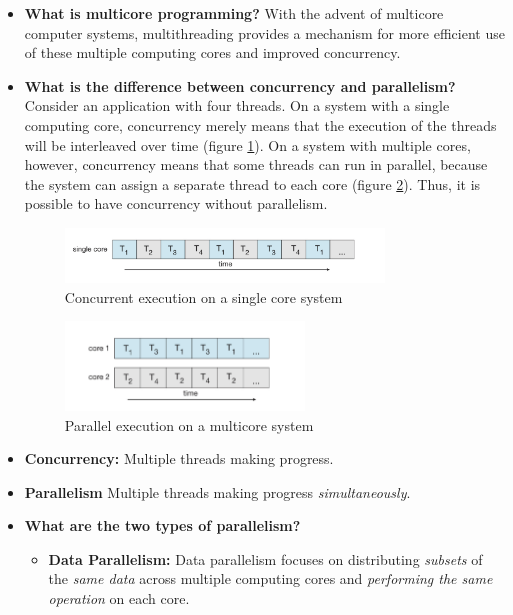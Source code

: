 \documentclass[12pt]{article}
\begin{document}
\begin{itemize}
    \item \textbf{What is multicore programming?} With the advent of multicore computer systems, multithreading provides a mechanism for more efficient use of these multiple computing cores and improved concurrency.
    \item \textbf{What is the difference between concurrency and parallelism?} Consider an application with four threads. On a system with a single computing core, concurrency merely means that the execution of the threads will be interleaved over time (figure \ref{fig:concurrent-execution}). On a system with multiple cores, however, concurrency means that some threads can run in parallel, because the system can assign a separate thread to each core (figure \ref{fig:parallel-execution}). Thus, it is possible to have concurrency without parallelism.
        \begin{figure}[ht]
            \centering
            \includegraphics[width=0.8\textwidth]{figures/concurrent-execution.jpg}
            \caption{Concurrent execution on a single core system}
            \label{fig:concurrent-execution}
        \end{figure}
        \begin{figure}[ht]
            \centering
            \includegraphics[width=0.6\textwidth]{figures/parallel-execution.jpg}
            \caption{Parallel execution on a multicore system}
            \label{fig:parallel-execution}
        \end{figure}
    \item \textbf{Concurrency:} Multiple threads making progress.
    \item \textbf{Parallelism} Multiple threads making progress \textit{simultaneously}.
    \item \textbf{What are the two types of parallelism?}
        \begin{itemize}
            \item \textbf{Data Parallelism:} Data parallelism focuses on distributing \textit{subsets} of the \textit{same data} across multiple computing cores and \textit{performing the same operation} on each core.

\end{itemize}
\end{itemize}
\end{document}
